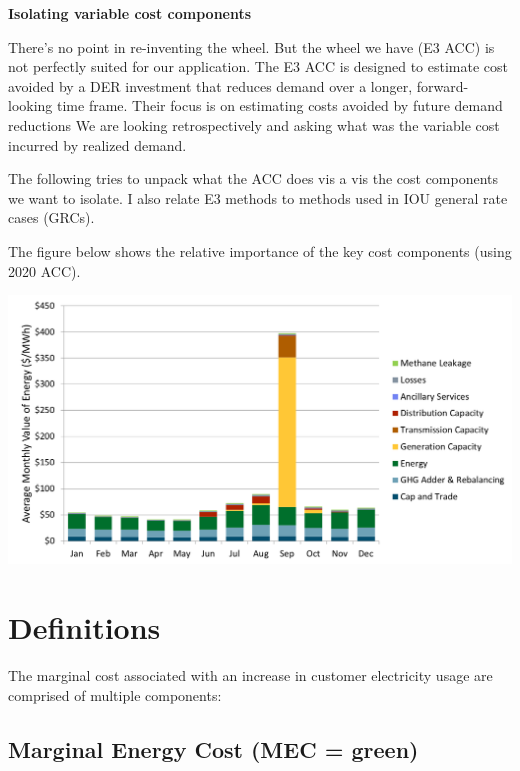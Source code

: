 \documentclass[11pt]{article}
\begin{document}
\textbf{Isolating variable cost components}


There's no point in re-inventing the wheel. But the wheel we have (E3 ACC) is not perfectly suited for our application. The E3 ACC is designed to estimate cost avoided by a DER investment that reduces demand over a longer, forward-looking time frame. Their focus is on estimating costs avoided by future demand reductions We are looking retrospectively and asking what was the variable cost incurred by realized demand.  


\bigskip

The following tries to unpack what the ACC does vis a vis the cost components we want to isolate. I also relate E3 methods to methods used in IOU general rate cases (GRCs).

\bigskip

 The figure below shows the relative importance of the key cost components (using 2020 ACC).

\bigskip


\includegraphics[scale=0.7]{ACC2020.png}

\section{Definitions}

The marginal cost associated with an increase in customer electricity usage are comprised of multiple components:

\subsection{Marginal Energy Cost (MEC = green)}
\end{document}
